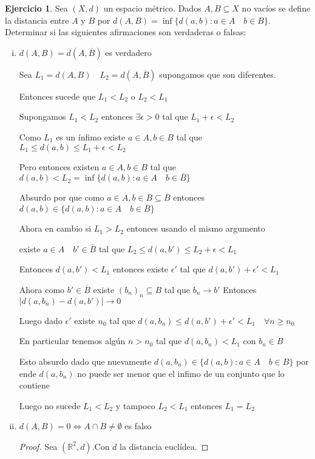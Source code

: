 \documentclass[11pt]{report}
\newcommand{\R}{\mathbb{R}}
\newcommand{\ra}{\rightarrow}
\newcommand{\ol}{\overline}
\theoremstyle{definition}
\newtheorem{ej}{Ejercicio}
\begin{document}
\begin{ej}
  Sea $(X,d)$ un espacio métrico. Dados $A,B \subseteq X$ no vacíos se define la distancia entre $A$ y $B$ por $d(A,B) = \inf{\{d(a,b): a\in A \quad b \in B\}}$. Determinar si las siguientes afirmaciones son verdaderas o falsas:
  \begin{enumerate}[i)]
        \item $d(A,B) = d(A ,\ol  B)$ es verdadero

      Sea $L_1 = d(A,B) \quad L_2 = d( A ,\ol B)$ supongamos que son diferentes. 

      Entonces sucede que $L_1 < L_2$ o $L_2 < L_1$

      Supongamos $L_1 < L_2$ entonces $\exists \epsilon > 0$ tal que $L_1 + \epsilon < L_2$

      Como $L_1$ es un ínfimo existe $a \in A, b \in B$ tal que $L_1 \leq d(a,b) \leq L_1 + \epsilon <  L_2 $

      Pero entonces existen $a \in A , b \in B$ tal que  $d(a,b) <  L_2  = \inf{\{d(a,b): a\in A \quad b \in \ol B\}}$

      Absurdo por que como $a \in A, b\in B\subseteq \ol B$ entonces $d(a,b) \in \{d(a,b): a\in A \quad b \in \ol B\}$

      Ahora en cambio si $L_1 > L_2$ entonces usando el mismo argumento

    existe $a \in A \quad b' \in \ol B$ tal que $L_2 \leq d(a,b') \leq L_2 + \epsilon <  L_1$

    Entonces $d(a,b') < L_1$ entonces existe $\epsilon '$ tal que $d(a,b') + \epsilon ' < L_1$

  Ahora como $b' \in \ol B$ existe $(b_n )_n \subseteq B$ tal que $b_n \ra b'$ Entonces $|d(a,b_n) - d(a,b')| \ra 0$ 

  Luego dado $\epsilon '$ existe $n_0$ tal que $d(a,b_n) \leq d(a,b') + \epsilon ' < L_1\quad \forall n \geq n_0$

  En particular tenemos algún $n > n_0$ tal que $d(a,b_n) < L_1$ con $b_n \in B$ 

  Esto absurdo dado que nuevamente $d(a,b_n) \in \{d(a,b) : a \in A \quad b \in B\}$ por ende $d(a,b_n)$ no puede ser menor que el infimo de un conjunto que lo contiene

Luego no sucede $L_1 < L_2 $ y tampoco $L_2 < L_1$ entonces $L_1 = L_2$
    \item $d(A,B) = 0 \iff A \cap B \neq \emptyset$ es falso
      \begin{proof}
	Sea $(\R^2,d)$.Con $d$ la distancia euclídea. 


\end{proof}
\end{enumerate}
\end{ej}
\end{document}
